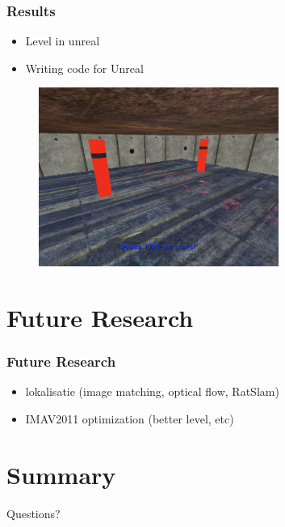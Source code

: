 \documentclass[10pt]{beamer}
\begin{document}
\begin{frame}
 \frametitle{Results}
 \begin{itemize}
  \item Level in unreal
  \item Writing code for Unreal
 \end{itemize}
 \begin{figure}
  \includegraphics[width=0.7\textwidth]{img/unreal_pylonlevel}
 \end{figure}
\end{frame}

\section{Future Research}
\begin{frame}
 \frametitle{Future Research}
 \begin{itemize}
  \item lokalisatie (image matching, optical flow, RatSlam)
  \item IMAV2011 optimization (better level, etc)
 \end{itemize}
\end{frame}

\section{Summary}
\begin{frame}
\begin{block}{Questions?}
\end{block}
\end{frame}
\end{document}
